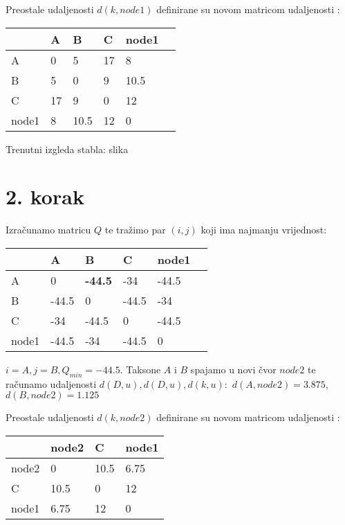 \documentclass[times, utf8, seminar, numeric]{fer}
\begin{document}
\pagebreak
Preostale udaljenosti $d(k,node1)$ definirane su novom matricom udaljenosti :

\begin{table}[h]
	\centering
    \begin{tabular}{|l|l|l|l|l|l|}
    \hline
	~ & A  & B    & C  & node1 \\ \hline
    A     & 0  & 5    & 17 & 8     \\ \hline
    B     & 5  & 0    & 9  & 10.5  \\ \hline
    C     & 17 & 9    & 0  & 12    \\ \hline
    node1 & 8  & 10.5 & 12 & 0     \\ \hline
    \end{tabular}
\end{table}

Trenutni izgleda stabla:
	slika
	
\section{2. korak}
Izračunamo matricu $Q$ te tražimo par $(i,j)$ koji ima najmanju vrijednost:

\begin{table}[h]
	\centering
    \begin{tabular}{|l|l|l|l|l|l|}
    \hline
~     & A     & B     & C     & node1 \\ \hline
    A     & 0     & \textbf{-44.5} & -34   & -44.5 \\ \hline
    B     & -44.5 & 0     & -44.5 & -34   \\ \hline
    C     & -34   & -44.5 & 0     & -44.5 \\ \hline
    node1 & -44.5 & -34   & -44.5 & 0     \\ \hline
    \end{tabular}
\end{table}

$i = A, j = B, Q_{min} = -44.5$. Taksone $A$ i $B$ spajamo u novi čvor $node2$ te računamo udaljenosti $d(D,u), d(D,u),d(k,u):$ \newline
\indent $d(A,node2) = 3.875$, \newline
\indent $d(B,node2) = 1.125$ \newline


Preostale udaljenosti $d(k,node2)$ definirane su novom matricom udaljenosti :

\begin{table}[h]
	\centering
    \begin{tabular}{|l|l|l|l|}
    \hline
    ~     & node2 & C    & node1 \\ \hline
    node2 & 0     & 10.5 & 6.75  \\ \hline
    C     & 10.5  & 0    & 12    \\ \hline
    node1 & 6.75  & 12   & 0     \\ \hline
    \end{tabular}
\end{table}
\end{document}
